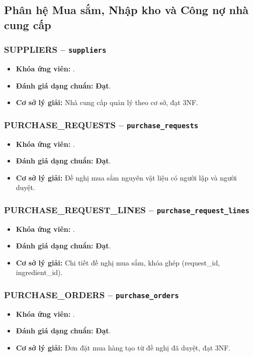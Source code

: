 \subsection{Phân hệ Mua sắm, Nhập kho và Công nợ nhà cung cấp}
\subsubsection{SUPPLIERS -- \texttt{suppliers}}
\begin{itemize}
  \item \textbf{Khóa ứng viên:} \texttt{}.
  \item \textbf{Đánh giá dạng chuẩn:} \textbf{Đạt}.
  \item \textbf{Cơ sở lý giải:} Nhà cung cấp quản lý theo cơ sở, đạt 3NF.
\end{itemize}

\subsubsection{PURCHASE_REQUESTS -- \texttt{purchase\_requests}}
\begin{itemize}
  \item \textbf{Khóa ứng viên:} \texttt{}.
  \item \textbf{Đánh giá dạng chuẩn:} \textbf{Đạt}.
  \item \textbf{Cơ sở lý giải:} Đề nghị mua sắm nguyên vật liệu có người lập và người duyệt.
\end{itemize}

\subsubsection{PURCHASE_REQUEST_LINES -- \texttt{purchase\_request\_lines}}
\begin{itemize}
  \item \textbf{Khóa ứng viên:} \texttt{}.
  \item \textbf{Đánh giá dạng chuẩn:} \textbf{Đạt}.
  \item \textbf{Cơ sở lý giải:} Chi tiết đề nghị mua sắm, khóa ghép (request_id, ingredient_id).
\end{itemize}

\subsubsection{PURCHASE_ORDERS -- \texttt{purchase\_orders}}
\begin{itemize}
  \item \textbf{Khóa ứng viên:} \texttt{}.
  \item \textbf{Đánh giá dạng chuẩn:} \textbf{Đạt}.
  \item \textbf{Cơ sở lý giải:} Đơn đặt mua hàng tạo từ đề nghị đã duyệt, đạt 3NF.
\end{itemize}

